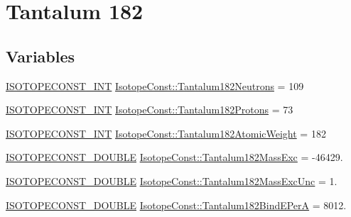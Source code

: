 \hypertarget{group___isotope_const-_tantalum-_ta182}{}\section{Tantalum 182}
\label{group___isotope_const-_tantalum-_ta182}
\subsection*{Variables}
\begin{DoxyCompactItemize}
\item 
\mbox{\hyperlink{group___isotope_const-_macros_ga5f18360b3e99483a35c32d789e62621c}{I\+S\+O\+T\+O\+P\+E\+C\+O\+N\+S\+T\+\_\+\+I\+NT}} \mbox{\hyperlink{group___isotope_const-_tantalum-_ta182_gaf861b6da2846ece0212731f23782c48a}{Isotope\+Const\+::\+Tantalum182\+Neutrons}} = 109
\item 
\mbox{\hyperlink{group___isotope_const-_macros_ga5f18360b3e99483a35c32d789e62621c}{I\+S\+O\+T\+O\+P\+E\+C\+O\+N\+S\+T\+\_\+\+I\+NT}} \mbox{\hyperlink{group___isotope_const-_tantalum-_ta182_ga5fdf0dbd3e31852fc03777559ea62378}{Isotope\+Const\+::\+Tantalum182\+Protons}} = 73
\item 
\mbox{\hyperlink{group___isotope_const-_macros_ga5f18360b3e99483a35c32d789e62621c}{I\+S\+O\+T\+O\+P\+E\+C\+O\+N\+S\+T\+\_\+\+I\+NT}} \mbox{\hyperlink{group___isotope_const-_tantalum-_ta182_gaecd1a50d069e3eac6b423c4d61d76475}{Isotope\+Const\+::\+Tantalum182\+Atomic\+Weight}} = 182
\item 
\mbox{\hyperlink{group___isotope_const-_macros_ga8f45a7272ce02c0b4c65c44636ed719a}{I\+S\+O\+T\+O\+P\+E\+C\+O\+N\+S\+T\+\_\+\+D\+O\+U\+B\+LE}} \mbox{\hyperlink{group___isotope_const-_tantalum-_ta182_ga7dd4f7be7b92a9ee1ddfcd1a14399eb5}{Isotope\+Const\+::\+Tantalum182\+Mass\+Exc}} = -\/46429.
\item 
\mbox{\hyperlink{group___isotope_const-_macros_ga8f45a7272ce02c0b4c65c44636ed719a}{I\+S\+O\+T\+O\+P\+E\+C\+O\+N\+S\+T\+\_\+\+D\+O\+U\+B\+LE}} \mbox{\hyperlink{group___isotope_const-_tantalum-_ta182_gaaffa88125e444b9600ae8664a9a40158}{Isotope\+Const\+::\+Tantalum182\+Mass\+Exc\+Unc}} = 1.
\item 
\mbox{\hyperlink{group___isotope_const-_macros_ga8f45a7272ce02c0b4c65c44636ed719a}{I\+S\+O\+T\+O\+P\+E\+C\+O\+N\+S\+T\+\_\+\+D\+O\+U\+B\+LE}} \mbox{\hyperlink{group___isotope_const-_tantalum-_ta182_ga170d22935b9a9edcb1a74b7ce862cf29}{Isotope\+Const\+::\+Tantalum182\+Bind\+E\+PerA}} = 8012.
\item 

\end{DoxyCompactItemize}
